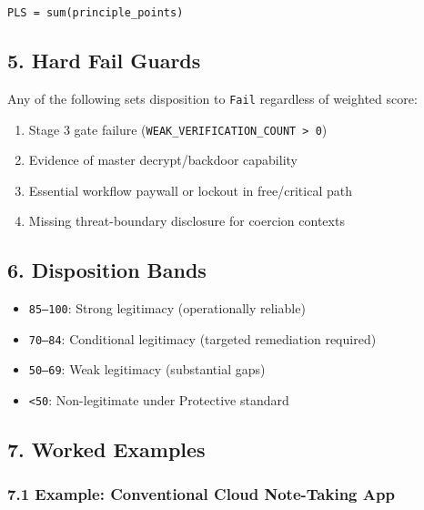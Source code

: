 \documentclass[
]{article}
\providecommand{\tightlist}{%
  \setlength{\itemsep}{0pt}\setlength{\parskip}{0pt}}
\begin{document}
\texttt{PLS\ =\ sum(principle\_points)}

\subsection{5. Hard Fail Guards}\label{5-hard-fail-guards}

Any of the following sets disposition to \texttt{Fail} regardless of
weighted score:

\begin{enumerate}
\def\labelenumi{\arabic{enumi}.}
\tightlist
\item
  Stage 3 gate failure
  (\texttt{WEAK\_VERIFICATION\_COUNT\ \textgreater{}\ 0})
\item
  Evidence of master decrypt/backdoor capability
\item
  Essential workflow paywall or lockout in free/critical path
\item
  Missing threat-boundary disclosure for coercion contexts
\end{enumerate}

\subsection{6. Disposition Bands}\label{6-disposition-bands}

\begin{itemize}
\tightlist
\item
  \texttt{85–100}: Strong legitimacy (operationally reliable)
\item
  \texttt{70–84}: Conditional legitimacy (targeted remediation required)
\item
  \texttt{50–69}: Weak legitimacy (substantial gaps)
\item
  \texttt{\textless{}50}: Non-legitimate under Protective standard
\end{itemize}

\subsection{7. Worked Examples}\label{7-worked-examples}

\subsubsection{7.1 Example: Conventional Cloud Note-Taking
App}\label{71-example-conventional-cloud-note-taking-app}
\end{document}
